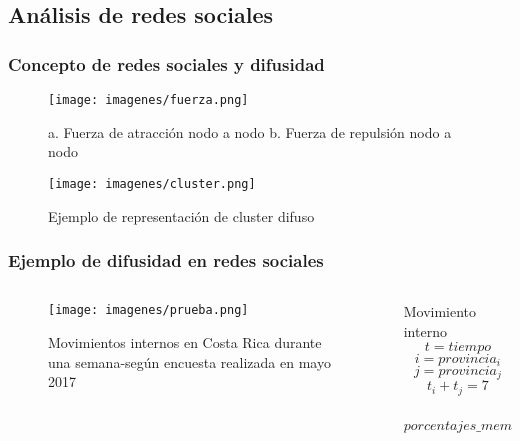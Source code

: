\documentclass[hyperref={pdfpagelabels=false}]{beamer}
\begin{document}
\subsection{An\'alisis de redes sociales}
\begin{frame}\frametitle{Concepto de redes sociales y difusidad}
        \begin{figure}[ht]
        \begin{minipage}[b]{0.45\linewidth}
            \centering
            \texttt{[image: imagenes/fuerza.png]}
            \caption{a. Fuerza de atracci\'on nodo a nodo b. Fuerza de repulsi\'on nodo a nodo}
            \label{fig:a}
        \end{minipage}
        \hspace{0.5cm}
        \begin{minipage}[b]{0.45\linewidth}
            \centering
            \texttt{[image: imagenes/cluster.png]}
            \caption{Ejemplo de representaci\'on de cluster difuso}
            \label{fig:b}
        \end{minipage}
    \end{figure}
\end{frame}
\begin{frame}\frametitle{Ejemplo de difusidad en redes sociales}
\begin{columns}
    \begin{column}{0.48\textwidth}
            \begin{figure}
    \caption{Movimientos internos en Costa Rica durante una semana-seg\'un encuesta realizada en mayo 2017}
        \begin{center}
            \texttt{[image: imagenes/prueba.png]}
        \end{center}
        \end{figure}
    \end{column}
    \begin{column}{0.48\textwidth}
       \begin{exampleblock}{Movimiento interno}
        \[ t=tiempo\]
        \[ i = provincia_i\]
        \[ j = provincia_j\]
        \[t_i + t_j = 7\]
        
        \[ 
        porcentajes\_membresia=\frac{t_i}{7} y \frac{t_j}{7}
        \]
        \end{exampleblock}
    \end{column}
\end{columns}

    
\end{frame}
\end{document}
